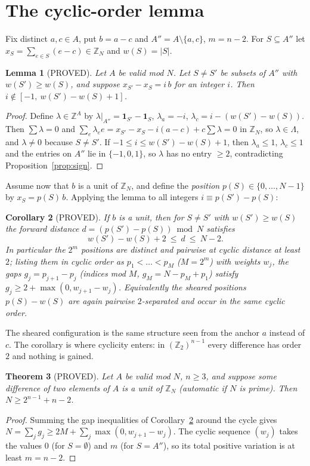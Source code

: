 \documentclass[11pt]{article}
\newtheorem{theorem}{Theorem}
\newtheorem{lemma}[theorem]{Lemma}
\newtheorem{corollary}[theorem]{Corollary}
\theoremstyle{definition}
\newcommand{\Z}{\mathbb{Z}}
\newcommand{\ZN}{\Z_N}
\begin{document}
\section{The cyclic-order lemma}
Fix distinct $a,c\in A$, put $b=a-c$ and $A''=A\setminus\{a,c\}$, $m=n-2$. For $S\subseteq A''$ let $x_S=\sum_{e\in S}(e-c)\in\ZN$ and $w(S)=|S|$.
\begin{lemma}[PROVED]\label{lem:order}
Let $A$ be valid mod $N$. Let $S\ne S'$ be subsets of $A''$ with $w(S')\ge w(S)$, and suppose $x_{S'}-x_S=i\,b$ for an integer $i$. Then $i\notin[-1,\ w(S')-w(S)+1]$.
\end{lemma}
\begin{proof}
Define $\lambda\in\Z^A$ by $\lambda|_{A''}=\mathbf 1_{S'}-\mathbf 1_S$, $\lambda_a=-i$, $\lambda_c=i-(w(S')-w(S))$. Then $\sum\lambda=0$ and $\sum_e\lambda_e e=x_{S'}-x_S-i(a-c)+c\sum\lambda= 0$ in $\ZN$, so $\lambda\in\Lambda$, and $\lambda\ne0$ because $S\neq S'$. If $-1\le i\le w(S')-w(S)+1$, then $\lambda_a\le 1$, $\lambda_c\le 1$ and the entries on $A''$ lie in $\{-1,0,1\}$, so $\lambda$ has no entry $\ge2$, contradicting Proposition~\ref{prop:sign}.
\end{proof}
Assume now that $b$ is a unit of $\ZN$, and define the \emph{position} $p(S)\in\{0,\dots,N-1\}$ by $x_S=p(S)\,b$. Applying the lemma to all integers $i\equiv p(S')-p(S)$:
\begin{corollary}[PROVED]\label{cor:struct}
If $b$ is a unit, then for $S\ne S'$ with $w(S')\ge w(S)$ the forward distance $d=(p(S')-p(S))\bmod N$ satisfies
\[ w(S')-w(S)+2\ \le\ d\ \le\ N-2 .\]
In particular the $2^m$ positions are distinct and pairwise at cyclic distance at least $2$; listing them in cyclic order as $p_1<\dots<p_M$ ($M=2^m$) with weights $w_j$, the gaps $g_j=p_{j+1}-p_j$ (indices mod $M$, $g_M=N-p_M+p_1$) satisfy $g_j\ge 2+\max(0,w_{j+1}-w_j)$. Equivalently the sheared positions $p(S)-w(S)$ are again pairwise $2$-separated and occur in the same cyclic order.
\end{corollary}
The sheared configuration is the same structure seen from the anchor $a$ instead of $c$. The corollary is where cyclicity enters: in $(\Z_2)^{n-1}$ every difference has order $2$ and nothing is gained.
\begin{theorem}[PROVED]\label{thm:tv}
Let $A$ be valid mod $N$, $n\ge 3$, and suppose some difference of two elements of $A$ is a unit of $\ZN$ (automatic if $N$ is prime). Then $N\ge 2^{n-1}+n-2$.
\end{theorem}
\begin{proof}
Summing the gap inequalities of Corollary~\ref{cor:struct} around the cycle gives $N=\sum_j g_j\ge 2M+\sum_j\max(0,w_{j+1}-w_j)$. The cyclic sequence $(w_j)$ takes the values $0$ (for $S=\emptyset$) and $m$ (for $S=A''$), so its total positive variation is at least $m=n-2$.
\end{proof}
\end{document}
